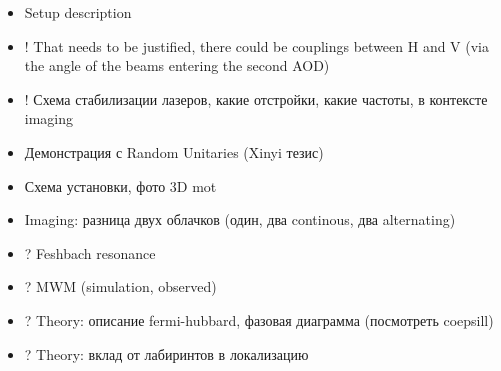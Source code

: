 \begin{itemize}
	\item Setup description
	\item ! That needs to be justified, there could be couplings between H and V (via the angle of the beams entering the second AOD)
	\item ! Схема стабилизации лазеров, какие отстройки, какие частоты, в контексте imaging
	\item Демонстрация с Random Unitaries (Xinyi тезис)
	\item Схема установки, фото 3D mot
	\item Imaging: разница двух облачков (один, два continous, два alternating)
	\item ? Feshbach resonance
	\item ? MWM (simulation, observed)
	\item ? Theory: описание fermi-hubbard, фазовая диаграмма (посмотреть coepsill)
	\item ? Theory: вклад от лабиринтов в локализацию
\end{itemize}







